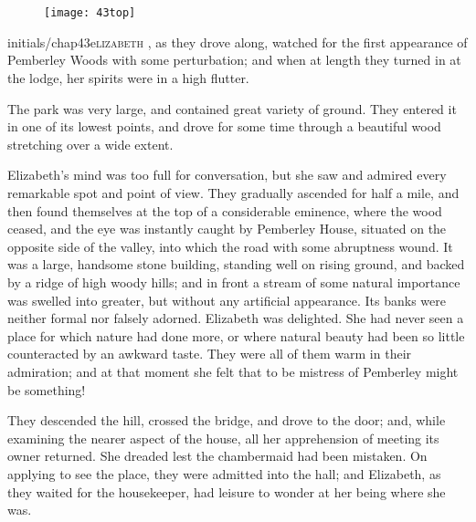 \chapter[Chapter \thechapter]{}
	
	
\begin{figure}[t!]
\centering
\texttt{[image: 43top]}
\end{figure}


\lettrine[lines=6,image=true]{initials/chap43e}{lizabeth} , as they drove along, watched for the first appearance of Pemberley Woods with some perturbation; and when at length they turned in at the lodge, her spirits were in a high flutter.

\zz
The park was very large, and contained great variety of ground. They entered it in one of its lowest points, and drove for some time through a beautiful wood stretching over a wide extent.

Elizabeth's mind was too full for conversation, but she saw and admired every remarkable spot and point of view. They gradually ascended for half a mile, and then found themselves at the top of a considerable eminence, where the wood ceased, and the eye was instantly caught by Pemberley House, situated on the opposite side of the valley, into which the road with some abruptness wound. It was a large, handsome stone building, standing well on rising ground, and backed by a ridge of high woody hills; and in front a stream of some natural importance was swelled into greater, but without any artificial appearance. Its banks were neither formal nor falsely adorned. Elizabeth was delighted. She had never seen a place for which nature had done more, or where natural beauty had been so little counteracted by an awkward taste. They were all of them warm in their admiration; and at that moment she felt that to be mistress of Pemberley might be something!

They descended the hill, crossed the bridge, and drove to the door; and, while examining the nearer aspect of the house, all her apprehension of meeting its owner returned. She dreaded lest the chambermaid had been mistaken. On applying to see the place, they were admitted into the hall; and Elizabeth, as they waited for the housekeeper, had leisure to wonder at her being where she was.

